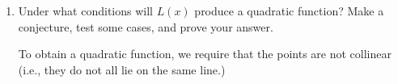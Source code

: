 \documentclass{ximera}
\begin{document}
\begin{problem}
\begin{enumerate}
\begin{solution}
     The three points lie on the same line and we get $L(x) = -x+5$.
\end{solution}

\item  Under what conditions will $L(x)$ produce a quadratic function?  Make a conjecture, test some cases, and prove your answer.

\begin{solution}
    To obtain a quadratic function, we require that the points are not collinear (i.e., they do not all lie on the same line.)
\end{solution}

\end{enumerate}


\end{problem}
\end{document}
